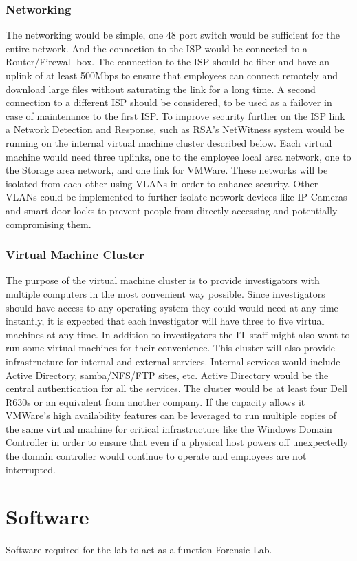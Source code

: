 \documentclass{article}
\begin{document}
\subsubsection{Networking} The networking would be simple, one 48 port switch would be sufficient for the entire network. And the connection to the ISP would be connected to a Router/Firewall box. The connection to the ISP should be fiber and have an uplink of at least 500Mbps to ensure that employees can connect remotely and download large files without saturating the link for a long time. A second connection to a different ISP should be considered, to be used as a failover in case of maintenance to the first ISP. To improve security further on the ISP link a Network Detection and Response, such as RSA's NetWitness system would be running on the internal virtual machine cluster described below. Each virtual machine would need three uplinks, one to the employee local area network, one to the Storage area network, and one link for VMWare. These networks will be isolated from each other using VLANs in order to enhance security. Other VLANs could be implemented to further isolate network devices like IP Cameras and smart door locks to prevent people from directly accessing and potentially compromising them. 
\subsubsection{Virtual Machine Cluster} The purpose of the virtual machine cluster is to provide investigators with multiple computers in the most convenient way possible. Since investigators should have access to any operating system they could would need at any time instantly, it is expected that each investigator will have three to five virtual machines at any time. In addition to investigators the IT staff might also want to run some virtual machines for their convenience. This cluster will also provide infrastructure for internal and external services. Internal services would include Active Directory, samba/NFS/FTP sites, etc. Active Directory would be the central authentication for all the services. The cluster would be at least four Dell R630s or an equivalent from another company. If the capacity allows it VMWare's high availability features can be leveraged to run multiple copies of the same virtual machine for critical infrastructure like the Windows Domain Controller in order to ensure that even if a physical host powers off unexpectedly the domain controller would continue to operate and employees are not interrupted. 


\section{Software}
Software required for the lab to act as a function Forensic Lab.
\end{document}
